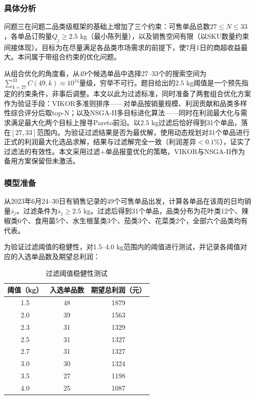 
\subsubsection{具体分析}

问题三在问题二品类级框架的基础上增加了三个约束：可售单品总数$27 \leq N \leq 33$，各单品订购量$Q_j \geq 2.5$ kg（最小陈列量），以及销售空间有限（以SKU数量约束间接体现）。目标为在尽量满足各品类市场需求的前提下，使7月1日的商超收益最大。本问属于带组合约束的优化问题。

从组合优化的角度看，从49个候选单品中选择27--33个的搜索空间为$\sum_{k=27}^{33}C(49,k) \approx 10^{14}$量级，穷举不可行。题目给出的$2.5$ kg阈值是一个预先指定的约束条件，非事后调整。本文以此为过滤标准，同时准备了两套组合优化方案作为验证手段：VIKOR多准则排序——对单品按销量规模、利润贡献和品类多样性综合评分后取top-N；以及NSGA-II多目标进化算法\cite{Deb2002}——同时在利润最大化与需求满足最大化两个目标上搜寻Pareto前沿。以$2.5$ kg过滤后恰好得到31个单品，落在$[27,33]$范围内。为验证过滤结果是否为最优解，使用动态规划对31个单品进行正式的利润最大化选品求解，结果与过滤解完全一致（利润差异$<0.1\%$），证实了过滤法的有效性。本文采用过滤+单品报童优化的策略，VIKOR与NSGA-II作为备用方案保留但未激活。

\subsubsection{模型准备}

从2023年6月24--30日有销售记录的49个可售单品出发，计算各单品在该周的日均销量$\bar{s}_j$。过滤条件为$\bar{s}_j \geq 2.5$ kg。过滤后得到31个单品，品类分布为花叶类12个、辣椒类6个、食用菌5个、水生根茎类3个、茄类3个、花菜类2个，全部六个品类均有代表。

为验证过滤阈值的稳健性，对1.5--4.0 kg范围内的阈值进行测试，并记录各阈值对应的入选单品数及期望总利润：

\begin{table}[H]
  \centering
  \caption{过滤阈值稳健性测试}
  \label{tab:threshold}
  \begin{tabularx}{\textwidth}{CCC}
    \toprule
    阈值（kg） & 入选单品数 & 期望总利润（元） \\
     & 48 & 1879 \\
    2.0 & 39 & 1563 \\
    2.3 & 31 & 1329 \\
    2.5 & 31 & 1327 \\
    2.7 & 31 & 1327 \\
    3.0 & 30 & 1324 \\
    3.5 & 27 & 1198 \\
    4.0 & 25 & 1087 \\
    \bottomrule
  \end{tabularx}
\end{table}

